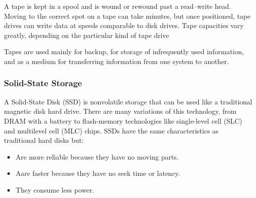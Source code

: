 A tape is kept in a spool and is wound or rewound past a read–write head.
Moving to the correct spot on a tape can take minutes, but once positioned, tape drives can write data at speeds comparable to disk drives.
Tape capacities vary greatly, depending on the particular kind of tape drive

Tapes are used mainly for backup, for storage of infrequently used information, and as a medium for transferring information from one system to another.

\subsubsection{Solid-State Storage}\label{subsubsec:Solid_State_Storage}
A Solid-State Disk (SSD) is nonvolatile storage that can be used like a traditional magnetic disk hard drive.
There are many variations of this technology, from DRAM with a battery to flash-memory technologies like single-level cell (SLC) and multilevel cell (MLC) chips.
SSDs have the same characteristics as traditional hard disks but:
\begin{itemize}[noitemsep]
\item Are more reliable because they have no moving parts.
\item Aare faster because they have no seek time or latency.
\item They consume less power.
\end{itemize}


